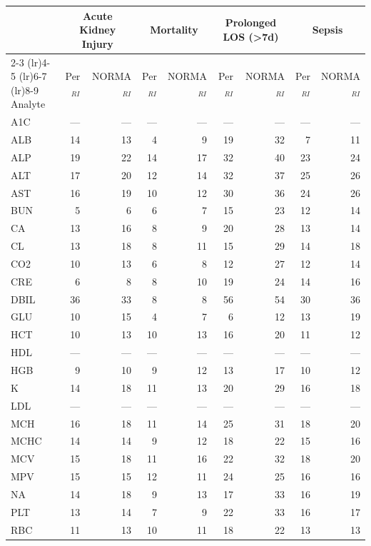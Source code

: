 \begin{table}[ht]
\centering
\footnotesize
\begin{tabular}{lrrrrrrrr}
\toprule
 & \multicolumn{2}{c}{Acute Kidney Injury} & \multicolumn{2}{c}{Mortality} & \multicolumn{2}{c}{Prolonged LOS (>7d)} & \multicolumn{2}{c}{Sepsis} \\
\cmidrule(lr){2-3} \cmidrule(lr){4-5} \cmidrule(lr){6-7} \cmidrule(lr){8-9}
Analyte & Per$_{RI}$ & NORMA$_{RI}$ & Per$_{RI}$ & NORMA$_{RI}$ & Per$_{RI}$ & NORMA$_{RI}$ & Per$_{RI}$ & NORMA$_{RI}$ \\
\midrule
A1C & --- & --- & --- & --- & --- & --- & --- & --- \\
ALB & 14 & 13 & 4 & 9 & 19 & 32 & 7 & 11 \\
ALP & 19 & 22 & 14 & 17 & 32 & 40 & 23 & 24 \\
ALT & 17 & 20 & 12 & 14 & 32 & 37 & 25 & 26 \\
AST & 16 & 19 & 10 & 12 & 30 & 36 & 24 & 26 \\
BUN & 5 & 6 & 6 & 7 & 15 & 23 & 12 & 14 \\
CA & 13 & 16 & 8 & 9 & 20 & 28 & 13 & 14 \\
CL & 13 & 18 & 8 & 11 & 15 & 29 & 14 & 18 \\
CO2 & 10 & 13 & 6 & 8 & 12 & 27 & 12 & 14 \\
CRE & 6 & 8 & 8 & 10 & 19 & 24 & 14 & 16 \\
DBIL & 36 & 33 & 8 & 8 & 56 & 54 & 30 & 36 \\
GLU & 10 & 15 & 4 & 7 & 6 & 12 & 13 & 19 \\
HCT & 10 & 13 & 10 & 13 & 16 & 20 & 11 & 12 \\
HDL & --- & --- & --- & --- & --- & --- & --- & --- \\
HGB & 9 & 10 & 9 & 12 & 13 & 17 & 10 & 12 \\
K & 14 & 18 & 11 & 13 & 20 & 29 & 16 & 18 \\
LDL & --- & --- & --- & --- & --- & --- & --- & --- \\
MCH & 16 & 18 & 11 & 14 & 25 & 31 & 18 & 20 \\
MCHC & 14 & 14 & 9 & 12 & 18 & 22 & 15 & 16 \\
MCV & 15 & 18 & 11 & 16 & 22 & 32 & 18 & 20 \\
MPV & 15 & 15 & 12 & 11 & 24 & 25 & 16 & 16 \\
NA & 14 & 18 & 9 & 13 & 17 & 33 & 16 & 19 \\
PLT & 13 & 14 & 7 & 9 & 22 & 33 & 16 & 17 \\
RBC & 11 & 13 & 10 & 11 & 18 & 22 & 13 & 13 \\

\end{tabular}
\end{table}

